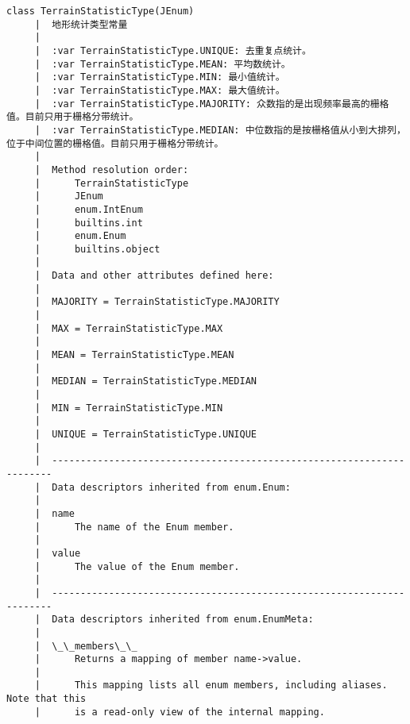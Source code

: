 \documentclass[11pt]{article}
\begin{document}
\begin{Verbatim}[commandchars=\\\{\}]
    class TerrainStatisticType(JEnum)
     |  地形统计类型常量
     |  
     |  :var TerrainStatisticType.UNIQUE: 去重复点统计。
     |  :var TerrainStatisticType.MEAN: 平均数统计。
     |  :var TerrainStatisticType.MIN: 最小值统计。
     |  :var TerrainStatisticType.MAX: 最大值统计。
     |  :var TerrainStatisticType.MAJORITY: 众数指的是出现频率最高的栅格值。目前只用于栅格分带统计。
     |  :var TerrainStatisticType.MEDIAN: 中位数指的是按栅格值从小到大排列，位于中间位置的栅格值。目前只用于栅格分带统计。
     |  
     |  Method resolution order:
     |      TerrainStatisticType
     |      JEnum
     |      enum.IntEnum
     |      builtins.int
     |      enum.Enum
     |      builtins.object
     |  
     |  Data and other attributes defined here:
     |  
     |  MAJORITY = TerrainStatisticType.MAJORITY
     |  
     |  MAX = TerrainStatisticType.MAX
     |  
     |  MEAN = TerrainStatisticType.MEAN
     |  
     |  MEDIAN = TerrainStatisticType.MEDIAN
     |  
     |  MIN = TerrainStatisticType.MIN
     |  
     |  UNIQUE = TerrainStatisticType.UNIQUE
     |  
     |  ----------------------------------------------------------------------
     |  Data descriptors inherited from enum.Enum:
     |  
     |  name
     |      The name of the Enum member.
     |  
     |  value
     |      The value of the Enum member.
     |  
     |  ----------------------------------------------------------------------
     |  Data descriptors inherited from enum.EnumMeta:
     |  
     |  \_\_members\_\_
     |      Returns a mapping of member name->value.
     |      
     |      This mapping lists all enum members, including aliases. Note that this
     |      is a read-only view of the internal mapping.
    

\end{Verbatim}
\end{document}
